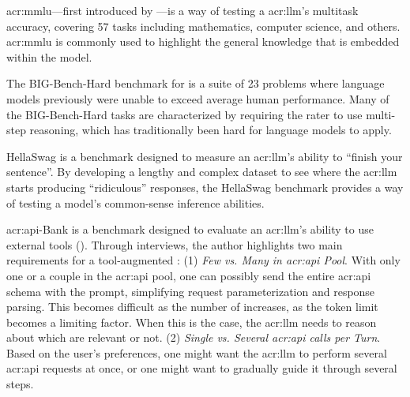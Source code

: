 \gls{acr:mmlu}---first introduced by \cite{hendrycksMeasuringMassiveMultitask2021}---is a way of testing a \acrlong{acr:llm}'s multitask accuracy, covering 57 tasks including mathematics, computer science, and others. \gls{acr:mmlu} is commonly used to highlight the general knowledge that is embedded within the model.

The BIG-Bench-Hard benchmark \cite{suzgunChallengingBIGBenchTasks2022} for  is a suite of 23 problems where language models previously were unable to exceed average human performance. Many of the BIG-Bench-Hard tasks are characterized by requiring the rater to use multi-step reasoning, which has traditionally been hard for language models to apply.

HellaSwag \citep{zellersHellaSwagCanMachine2019} is a benchmark designed to measure an \acrshort{acr:llm}'s ability to \enquote{finish your sentence}. By developing a lengthy and complex dataset to see where the \acrshort{acr:llm} starts producing \enquote{ridiculous} responses, the HellaSwag benchmark provides a way of testing a model's common-sense inference abilities.

\acrshort{acr:api}-Bank \citep{liAPIBankComprehensiveBenchmark2023} is a benchmark designed to evaluate an \acrshort{acr:llm}'s ability to use external tools (). Through interviews, the author highlights two main requirements for a tool-augmented  \citep[2]{liAPIBankComprehensiveBenchmark2023}: (1) \textit{Few vs. Many  in \acrshort{acr:api} Pool}. With only one or a couple  in the \acrshort{acr:api} pool, one can possibly send the entire \acrshort{acr:api} schema with the prompt, simplifying request parameterization and response parsing. This becomes difficult as the number of  increases, as the token limit becomes a limiting factor. When this is the case, the \acrshort{acr:llm} needs to reason about which  are relevant or not. (2) \textit{Single vs. Several \acrshort{acr:api} calls per Turn}. Based on the user's preferences, one might want the \acrshort{acr:llm} to perform several \acrshort{acr:api} requests at once, or one might want to gradually guide it through several steps.

\glsresetall